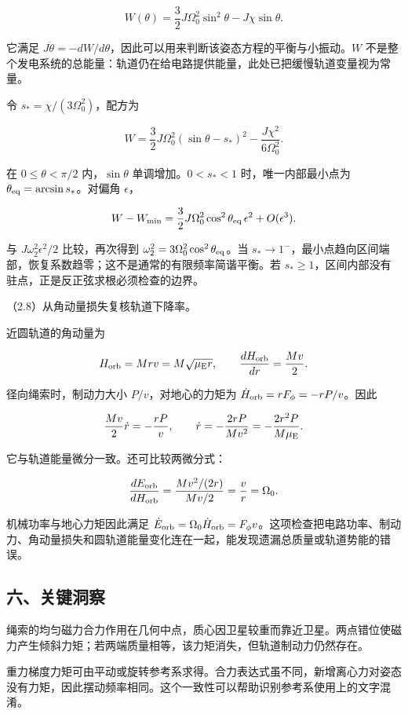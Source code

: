 \documentclass[12pt,a4paper,fontset=fandol]{ctexart}
\begin{document}
\[
W(\theta)=\frac32J\Omega_0^2\sin^2\theta-J\chi\sin\theta.
\]

它满足
\(J\ddot\theta=-dW/d\theta\)，因此可以用来判断该姿态方程的平衡与小振动。\(W\)
不是整个发电系统的总能量：轨道仍在给电路提供能量，此处已把缓慢轨道变量视为常量。

令 \(s_*=\chi/(3\Omega_0^2)\)，配方为

\[
W=\frac32J\Omega_0^2(\sin\theta-s_*)^2
-\frac{J\chi^2}{6\Omega_0^2}.
\]

在 \(0\le\theta<\pi/2\) 内，\(\sin\theta\) 单调增加。\(0<s_*<1\)
时，唯一内部最小点为 \(\theta_{\rm eq}=\arcsin s_*\)。对偏角
\(\epsilon\)，

\[
W-W_{\min}
=\frac32J\Omega_0^2\cos^2\theta_{\rm eq}\,\epsilon^2
+O(\epsilon^3).
\]

与 \(J\omega_2^2\epsilon^2/2\) 比较，再次得到
\(\omega_2^2=3\Omega_0^2\cos^2\theta_{\rm eq}\)。当
\(s_*\to1^-\)，最小点趋向区间端部，恢复系数趋零；这不是通常的有限频率简谐平衡。若
\(s_*\ge1\)，区间内部没有驻点，正是反正弦求根必须检查的边界。

（2.8）从角动量损失复核轨道下降率。

近圆轨道的角动量为

\[
H_{\rm orb}=Mr v=M\sqrt{\mu_{\rm E}r},\qquad
\frac{dH_{\rm orb}}{dr}=\frac{Mv}{2}.
\]

径向绳索时，制动力大小 \(P/v\)，对地心的力矩为
\(\dot H_{\rm orb}=rF_\phi=-rP/v\)。因此

\[
\frac{Mv}{2}\dot r=-\frac{rP}{v},\qquad
\dot r=-\frac{2rP}{Mv^2}
=-\frac{2r^2P}{M\mu_{\rm E}}.
\]

它与轨道能量微分一致。还可比较两微分式：

\[
\frac{dE_{\rm orb}}{dH_{\rm orb}}
=\frac{Mv^2/(2r)}{Mv/2}=\frac vr=\Omega_0.
\]

机械功率与地心力矩因此满足
\(\dot E_{\rm orb}=\Omega_0\dot H_{\rm orb}=F_\phi v\)。这项检查把电路功率、制动力、角动量损失和圆轨道能量变化连在一起，能发现遗漏总质量或轨道势能的错误。

\subsection{六、关键洞察}\label{ux516dux5173ux952eux6d1eux5bdf-3}

绳索的均匀磁力合力作用在几何中点，质心因卫星较重而靠近卫星。两点错位使磁力产生倾斜力矩；若两端质量相等，该力矩消失，但轨道制动力仍然存在。

重力梯度力矩可由平动或旋转参考系求得。合力表达式虽不同，新增离心力对姿态没有力矩，因此摆动频率相同。这个一致性可以帮助识别参考系使用上的文字混淆。
\end{document}
